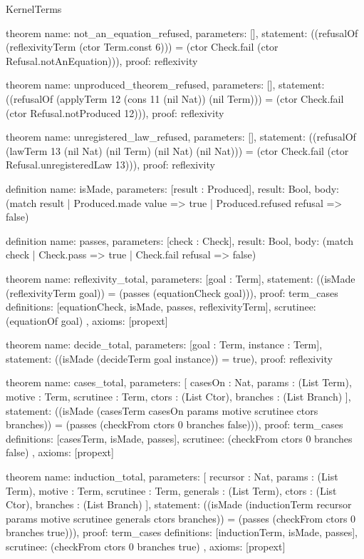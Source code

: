 \begin{lexlean}{KernelTerms}
\begin{semanticmodule}
theorem{
  name: not_an_equation_refused,
  parameters: [],
  statement: ((refusalOf (reflexivityTerm (ctor Term.const 6))) = (ctor Check.fail (ctor Refusal.notAnEquation))),
  proof: reflexivity{}
}

theorem{
  name: unproduced_theorem_refused,
  parameters: [],
  statement: ((refusalOf (applyTerm 12 (cons 11 (nil Nat)) (nil Term))) = (ctor Check.fail (ctor Refusal.notProduced 12))),
  proof: reflexivity{}
}

theorem{
  name: unregistered_law_refused,
  parameters: [],
  statement: ((refusalOf (lawTerm 13 (nil Nat) (nil Term) (nil Nat) (nil Nat))) = (ctor Check.fail (ctor Refusal.unregisteredLaw 13))),
  proof: reflexivity{}
}

definition{
  name: isMade,
  parameters: [result : Produced],
  result: Bool,
  body: (match result | Produced.made value => true | Produced.refused refusal => false)
}

definition{
  name: passes,
  parameters: [check : Check],
  result: Bool,
  body: (match check | Check.pass => true | Check.fail refusal => false)
}

theorem{
  name: reflexivity_total,
  parameters: [goal : Term],
  statement: ((isMade (reflexivityTerm goal)) = (passes (equationCheck goal))),
  proof: term_cases{
    definitions: [equationCheck, isMade, passes, reflexivityTerm],
    scrutinee: (equationOf goal)
  },
  axioms: [propext]
}

theorem{
  name: decide_total,
  parameters: [goal : Term, instance : Term],
  statement: ((isMade (decideTerm goal instance)) = true),
  proof: reflexivity{}
}

theorem{
  name: cases_total,
  parameters: [
    casesOn : Nat,
    params : (List Term),
    motive : Term,
    scrutinee : Term,
    ctors : (List Ctor),
    branches : (List Branch)
  ],
  statement: ((isMade (casesTerm casesOn params motive scrutinee ctors branches)) = (passes (checkFrom ctors 0 branches false))),
  proof: term_cases{
    definitions: [casesTerm, isMade, passes],
    scrutinee: (checkFrom ctors 0 branches false)
  },
  axioms: [propext]
}

theorem{
  name: induction_total,
  parameters: [
    recursor : Nat,
    params : (List Term),
    motive : Term,
    scrutinee : Term,
    generals : (List Term),
    ctors : (List Ctor),
    branches : (List Branch)
  ],
  statement: ((isMade (inductionTerm recursor params motive scrutinee generals ctors branches)) = (passes (checkFrom ctors 0 branches true))),
  proof: term_cases{
    definitions: [inductionTerm, isMade, passes],
    scrutinee: (checkFrom ctors 0 branches true)
  },
  axioms: [propext]
}


\end{semanticmodule}
\end{lexlean}
